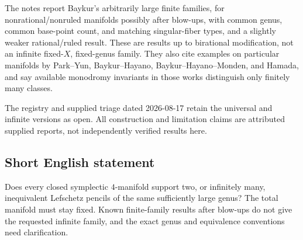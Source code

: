 \documentclass[11pt]{article}
\begin{document}
The notes report Baykur's arbitrarily large finite families, for nonrational/nonruled manifolds possibly after blow-ups, with common genus, common base-point count, and matching singular-fiber types, and a slightly weaker rational/ruled result. These are results up to birational modification, not an infinite fixed-$X$, fixed-genus family. They also cite examples on particular manifolds by Park--Yun, Baykur--Hayano, Baykur--Hayano--Monden, and Hamada, and say available monodromy invariants in those works distinguish only finitely many classes.

The registry and supplied triage dated 2026-08-17 retain the universal and infinite versions as open. All construction and limitation claims are attributed supplied reports, not independently verified results here.
\subsection{Short English statement}
Does every closed symplectic $4$-manifold support two, or infinitely many, inequivalent Lefschetz pencils of the same sufficiently large genus? The total manifold must stay fixed. Known finite-family results after blow-ups do not give the requested infinite family, and the exact genus and equivalence conventions need clarification.
\end{document}
